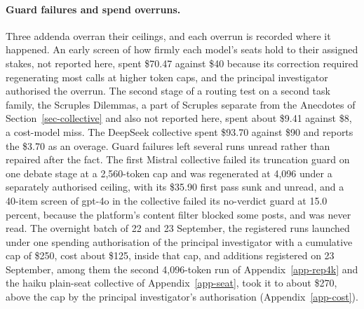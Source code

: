 \paragraph{Guard failures and spend overruns.}
Three addenda overran their ceilings, and each overrun is recorded where it
happened. An early screen of how firmly each model's seats hold to their assigned
stakes, not reported here, spent \$70.47 against \$40 because
its correction required regenerating most calls at higher token caps, and the
principal investigator authorised the overrun. The second stage of a routing
test on a second task family, the Scruples Dilemmas, a part of Scruples
separate from the Anecdotes of Section~\ref{sec-collective} and also not
reported here, spent about \$9.41 against \$8, a cost-model miss. The DeepSeek collective
spent \$93.70 against
\$90 and reports the \$3.70 as an overage.
Guard failures left several runs unread rather than repaired after the fact.
The first Mistral collective failed its truncation guard on one debate stage at a
2,560-token cap and was regenerated at 4,096 under a separately authorised
ceiling, with its \$35.90 first pass sunk and unread, and a 40-item screen of
gpt-4o in the collective failed its no-verdict guard at 15.0 percent, because the
platform's content filter blocked some posts, and was never read.
The overnight batch of 22 and 23 September, the registered runs launched
under one spending authorisation of the principal investigator with a
cumulative cap of \$250, cost about \$125, inside that cap, and additions registered on 23 September, among them the second
4,096-token run of Appendix~\ref{app-rep4k} and the haiku plain-seat
collective of Appendix~\ref{app-seat}, took it to about \$270, above the cap
by the principal investigator's authorisation (Appendix~\ref{app-cost}).

